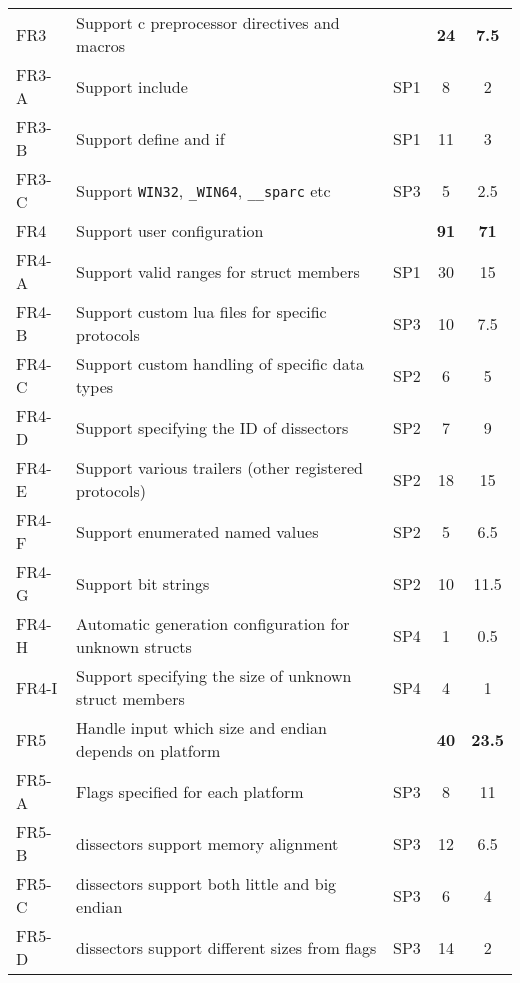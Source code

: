 \begin{table}[htbp]
\begin{tabularx}{\textwidth}{l X c c c}
    \addlinespace
	FR3 & Support \Gls{c} \gls{preprocessor} directives and macros & & \textbf{24} &  \textbf{7.5}\\
	FR3-A & Support \gls{include} & SP1 & 8 & 2 \\
	FR3-B & Support \gls{define} and \gls{if} & SP1 & 11 & 3 \\
	FR3-C & Support \verb+WIN32+, \verb+_WIN64+, \verb+__sparc+ etc & SP3 & 5 & 2.5 \\
	\addlinespace
	FR4 & Support user configuration & & \textbf{91} & \textbf{71}\\
	FR4-A & Support valid ranges for \gls{struct} \glspl{member} & SP1 & 30 & 15 \\
	FR4-B & Support custom \Gls{lua} files for specific protocols & SP3 & 10 & 7.5 \\
	FR4-C & Support custom handling of specific data types & SP2 & 6 & 5 \\
	FR4-D & Support specifying the ID of \glspl{dissector} & SP2 & 7 & 9 \\
	FR4-E & Support various \gls{trailers} (other registered protocols) & SP2 & 18 & 15 \\
	FR4-F & Support \glspl{enumerated named value} & SP2 & 5 & 6.5 \\
	FR4-G & Support bit strings & SP2 & 10 & 11.5 \\
	FR4-H & Automatic generation configuration for unknown structs & SP4 & 1 & 0.5\\
	FR4-I & Support specifying the size of unknown struct members & SP4 & 4 & 1\\
	\addlinespace
	FR5 & Handle input which size and \gls{endian} depends on platform & & \textbf{40} & \textbf{23.5} \\
	FR5-A & Flags specified for each platform & SP3 & 8 & 11 \\
	FR5-B & \Glspl{dissector} support memory alignment & SP3 & 12 & 6.5 \\
	FR5-C & \Glspl{dissector} support both little and big \gls{endian} & SP3 & 6 & 4 \\
	FR5-D & \Glspl{dissector} support different sizes from flags & SP3 & 14 & 2 \\	
    \bottomrule
\end{tabularx}
\end{table}	
	
